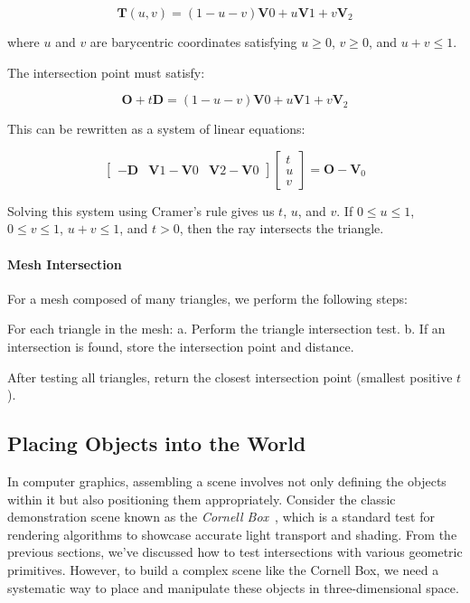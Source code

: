 \documentclass[12pt]{article}
\begin{document}
\[
    \mathbf{T}(u,v) = (1-u-v)\mathbf{V}0 + u\mathbf{V}1 + v\mathbf{V}_2
\]

where \(u\) and \(v\) are barycentric coordinates satisfying \(u \geq 0\), \(v \geq 0\), and \(u + v \leq 1\).

The intersection point must satisfy:

\[
    \mathbf{O} + t\mathbf{D} = (1-u-v)\mathbf{V}0 + u\mathbf{V}1 + v\mathbf{V}_2
\]

This can be rewritten as a system of linear equations:

\[
    \begin{bmatrix}
        -\mathbf{D} & \mathbf{V}1 - \mathbf{V}0 & \mathbf{V}2 - \mathbf{V}0
    \end{bmatrix}
    \begin{bmatrix}
        t \\ u \\ v
    \end{bmatrix}
    = \mathbf{O} - \mathbf{V}_0
\]

Solving this system using Cramer's rule gives us \(t\), \(u\), and \(v\). If \(0 \leq u \leq 1\), \(0 \leq v \leq 1\), \(u + v \leq 1\), and \(t > 0\), then the ray intersects the triangle.

\paragraph{Mesh Intersection}

For a mesh composed of many triangles, we perform the following steps:

For each triangle in the mesh:
a. Perform the triangle intersection test.
b. If an intersection is found, store the intersection point and distance.

After testing all triangles, return the closest intersection point (smallest positive \(t\)).

\subsection{Placing Objects into the World}

In computer graphics, assembling a scene involves not only defining the objects within it but also positioning them appropriately. Consider the classic demonstration scene known as the \textit{Cornell Box}~\cite{cornellbox}, which is a standard test for rendering algorithms to showcase accurate light transport and shading.
From the previous sections, we've discussed how to test intersections with various geometric primitives. However, to build a complex scene like the Cornell Box, we need a systematic way to place and manipulate these objects in three-dimensional space.
\end{document}
